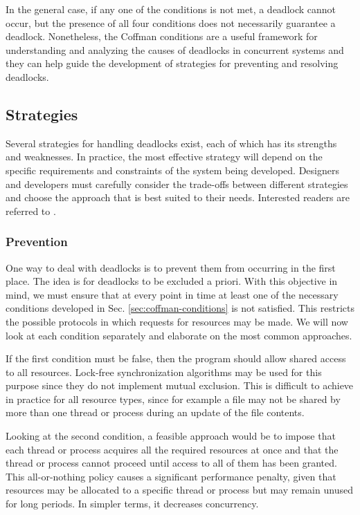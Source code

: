 In the general case, if any one of the conditions is not met, a deadlock cannot occur,
but the presence of all four conditions does not necessarily guarantee a deadlock.
Nonetheless, the Coffman conditions are a useful framework for understanding and
analyzing the causes of deadlocks in concurrent systems
and they can help guide the development of strategies for preventing and resolving deadlocks.

\subsection{Strategies}
\label{sec:deadlock-strategies}

Several strategies for handling deadlocks exist,
each of which has its strengths and weaknesses.
In practice, the most effective strategy will depend on the specific requirements
and constraints of the system being developed.
Designers and developers must carefully consider the trade-offs between different strategies
and choose the approach that is best suited to their needs.
Interested readers are referred to \cite{coffman1971deadlocks,singhal1989deadlock}.

\subsubsection{Prevention}

One way to deal with deadlocks is to prevent them from occurring in the first place.
The idea is for deadlocks to be excluded a priori.
With this objective in mind, we must ensure that at every point in time
at least one of the necessary conditions developed in Sec. \ref{sec:coffman-conditions}
is not satisfied.
This restricts the possible protocols in which requests for resources may be made.
We will now look at each condition separately
and elaborate on the most common approaches.

If the first condition must be false,
then the program should allow shared access to all resources.
Lock-free synchronization algorithms may be used for this purpose
since they do not implement mutual exclusion.
This is difficult to achieve in practice for all resource types,
since for example a file may not be shared by more than one thread or process
during an update of the file contents.

Looking at the second condition, a feasible approach would be to impose that
each thread or process acquires all the required resources at once and that
the thread or process cannot proceed until access to all of them has been granted.
This all-or-nothing policy causes a significant performance penalty,
given that resources may be allocated to a specific thread or process
but may remain unused for long periods.
In simpler terms, it decreases concurrency.

